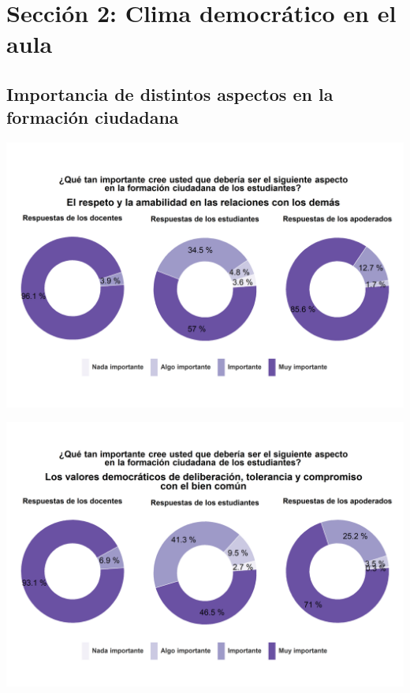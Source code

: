 \documentclass[
  14pt,
]{book}
\begin{document}
\hypertarget{secciuxf3n-2-clima-democruxe1tico-en-el-aula}{%
\section{Sección 2: Clima democrático en el aula}\label{secciuxf3n-2-clima-democruxe1tico-en-el-aula}}

\hypertarget{importancia-de-distintos-aspectos-en-la-formaciuxf3n-ciudadana}{%
\subsection{Importancia de distintos aspectos en la formación ciudadana}\label{importancia-de-distintos-aspectos-en-la-formaciuxf3n-ciudadana}}

\begin{center}\includegraphics[width=52.49in]{images/graph_for_ciud1} \end{center}

\begin{center}\includegraphics[width=52.49in]{images/graph_for_ciud2} \end{center}
\end{document}
